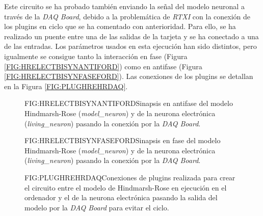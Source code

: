 Este circuito se ha probado también enviando la señal del modelo neuronal a través de la \textit{DAQ Board}, debido a la problemática de \textit{RTXI} con la conexión de los plugins en ciclo que se ha comentado con anterioridad. Para ello, se ha realizado un puente entre una de las salidas de la tarjeta y se ha conectado a una de las entradas. Los parámetros usados en esta ejecución han sido distintos, pero igualmente se consigue tanto la interacción en fase (Figura \ref{FIG:HRELECTBISYNANTIFORD}) como en antifase (Figura \ref{FIG:HRELECTBISYNFASEFORD}). Las conexiones de los plugins se detallan en la Figura \ref{FIG:PLUGHREHRDAQ}.

\begin{figure}[Sinapsis bidireccional modelo-electrónica en antifase con forwarding]{FIG:HRELECTBISYNANTIFORD}{Sinapsis en antifase del modelo Hindmarsh-Rose (\textit{model\_neuron}) y de la neurona electrónica (\textit{living\_neuron}) pasando la conexión por la \textit{DAQ Board}.}
\end{figure}

\begin{figure}[Sinapsis bidireccional modelo-electrónica en fase con forwarding]{FIG:HRELECTBISYNFASEFORD}{Sinapsis en fase del modelo Hindmarsh-Rose (\textit{model\_neuron}) y de la neurona electrónica (\textit{living\_neuron}) pasando la conexión por la \textit{DAQ Board}.}
\end{figure}

\begin{figure}[Esquema de conexión de plugins para la sinapsis entre el modelo y la neurona electrónica con DAQ forwarding]{FIG:PLUGHREHRDAQ}{Conexiones de plugins realizada para crear el circuito entre el modelo de Hindmarsh-Rose en ejecución en el ordenador y el de la neurona electrónica pasando la salida del modelo por la \textit{DAQ Board} para evitar el ciclo.}
\end{figure}\textbf{}
